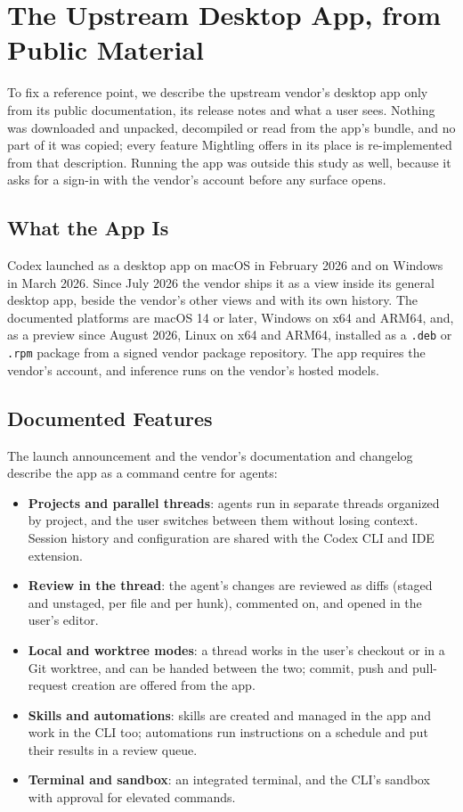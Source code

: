 \documentclass[11pt]{article}
\newcommand{\code}[1]{\texttt{#1}}
\begin{document}
\section{The Upstream Desktop App, from Public Material}
\label{sec:decomposition}

To fix a reference point, we describe the upstream vendor's desktop app only from its public documentation, its
release notes and what a user sees. Nothing was downloaded and unpacked, decompiled or read from the app's bundle,
and no part of it was copied; every feature Mightling offers in its place is re-implemented from that description.
Running the app was outside this study as well, because it asks for a sign-in with the vendor's account before any
surface opens.

\subsection{What the App Is}

Codex launched as a desktop app on macOS in February 2026 and on Windows in March 2026. Since July 2026 the vendor
ships it as a view inside its general desktop app, beside the vendor's other views and with its own history. The
documented platforms are macOS 14 or later, Windows on x64 and ARM64, and, as a preview since August 2026, Linux on
x64 and ARM64, installed as a \code{.deb} or \code{.rpm} package from a signed vendor package repository. The app
requires the vendor's account, and inference runs on the vendor's hosted models.

\subsection{Documented Features}

The launch announcement and the vendor's documentation and changelog describe the app as a command centre for agents:
\begin{itemize}
    \item \textbf{Projects and parallel threads}: agents run in separate threads organized by project, and the user
    switches between them without losing context. Session history and configuration are shared with the Codex CLI and
    IDE extension.
    \item \textbf{Review in the thread}: the agent's changes are reviewed as diffs (staged and unstaged, per file and
    per hunk), commented on, and opened in the user's editor.
    \item \textbf{Local and worktree modes}: a thread works in the user's checkout or in a Git worktree, and can be
    handed between the two; commit, push and pull-request creation are offered from the app.
    \item \textbf{Skills and automations}: skills are created and managed in the app and work in the CLI too;
    automations run instructions on a schedule and put their results in a review queue.
    \item \textbf{Terminal and sandbox}: an integrated terminal, and the CLI's sandbox with approval for elevated
    commands.
\end{itemize}
\end{document}
